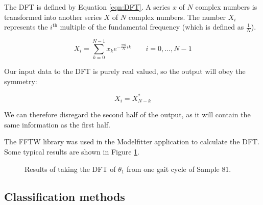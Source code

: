 The DFT is defined by Equation \ref{eqn:DFT}.
A series $x$ of $N$ complex numbers is transformed into another series $X$ of $N$ complex numbers.
The number $X_i$ represents the $i^\text{th}$ multiple of the fundamental frequency (which is defined as $\frac{1}{N}$).

\begin{equation}
	X_i = \sum_{k=0}^{N-1} x_k e^{-\frac{2 \pi i}{N} i k} \quad \quad i = 0, \dots, N-1
	\label{eqn:DFT}
\end{equation}

Our input data to the DFT is purely real valued, so the output will obey the symmetry:

\begin{equation}
	X_i = X_{N-k}^*
\end{equation}

We can therefore disregard the second half of the output, as it will contain the same information as the first half.

The FFTW library \cite{FFTW} was used in the Modelfitter application to calculate the DFT.
Some typical results are shown in Figure \ref{FFTResults}.

\begin{figure}[tb]
	\centering
	\quad
	\caption{Results of taking the DFT of $\theta_1$ from one gait cycle of Sample 81.}
	\label{FFTResults}
\end{figure}


\subsection{Classification methods}
\label{ClassificationMethods}

